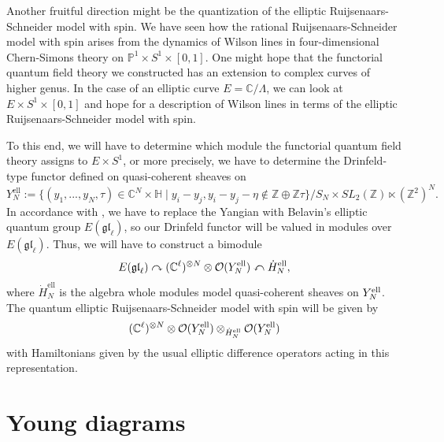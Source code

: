 \documentclass[11pt]{report}
\theoremstyle{definition}
\theoremstyle{remark}
\theoremstyle{remark}
\newcommand{\Z}{\mathbb{Z}}
\newcommand{\C}{\mathbb{C}}
\renewcommand{\P}{\mathbb{P}}
\begin{document}
Another fruitful direction might be the quantization of the elliptic Ruijsenaars-Schneider model with spin. We have seen how the rational Ruijsenaars-Schneider model with spin arises from the dynamics of Wilson lines in four-dimensional Chern-Simons theory on $\P^1 \times S^1 \times [0,1]$. One might hope that the functorial quantum field theory we constructed has an extension to complex curves of higher genus. In the case of an elliptic curve $E = \C/\Lambda$, we can look at $E \times S^1 \times [0,1]$ and hope for a description of Wilson lines in terms of the elliptic Ruijsenaars-Schneider model with spin.

To this end, we will have to determine which module the functorial quantum field theory assigns to $E \times S^1$, or more precisely, we have to determine the Drinfeld-type functor defined on quasi-coherent sheaves on
\begin{equation*}
Y_N^\text{ell} := \{ (y_1,...,y_N,\tau) \in \C^N \times \mathbb{H} \mid y_i-y_j,y_i-y_j-\eta \notin \Z \oplus \Z \tau \}/S_N \times SL_2(\Z) \ltimes (\Z^2)^N.
\end{equation*}
In accordance with \cite{article:costello:2018b}, we have to replace the Yangian with Belavin's elliptic quantum group $E(\mathfrak{gl}_\ell)$, so our Drinfeld functor will be valued in modules over $E(\mathfrak{gl}_\ell)$. Thus, we will have to construct a bimodule
\begin{equation*}
E(\mathfrak{gl}_\ell) \curvearrowright (\C^\ell)^{\otimes N} \otimes \mathcal{O}(Y_N^\textnormal{ell}) \curvearrowleft \dot H_N^\text{ell},
\end{equation*}
where $\dot H_N^\text{ell}$ is the algebra whole modules model quasi-coherent sheaves on $Y_N^\textnormal{ell}$. The quantum elliptic Ruijsenaars-Schneider model with spin will be given by
\begin{equation*}
(\C^\ell)^{\otimes N} \otimes \mathcal{O}(Y_N^\textnormal{ell}) \otimes_{\dot H_N^\text{ell}} \mathcal{O}(Y_N^\textnormal{ell})
\end{equation*}
with Hamiltonians given by the usual elliptic difference operators acting in this representation.



\appendix \label{appendix}

\chapter{Young diagrams} \label{appendix:youngdiagrams}
\end{document}
